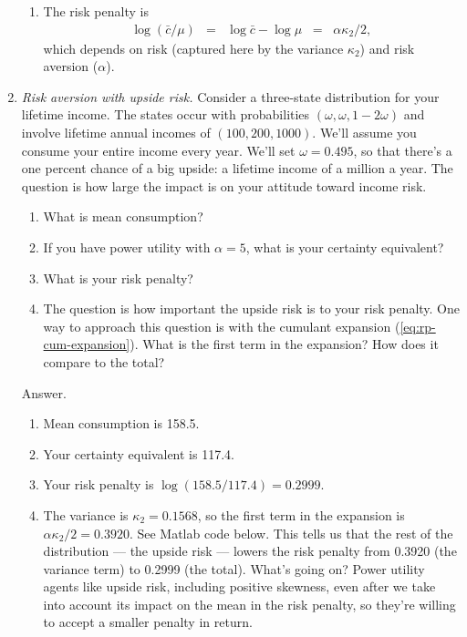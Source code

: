 \documentclass[11pt]{article}
\begin{document}
\begin{enumerate}
\begin{enumerate}
\item The risk penalty is
\begin{eqnarray*}
    \log (\bar{c}/\mu) &=& \log \bar{c} - \log \mu \;\;=\;\; \alpha\kappa_2/2 ,
\end{eqnarray*}
which depends on risk (captured here by the variance $\kappa_2$)
and risk aversion ($\alpha$).
\end{enumerate}


\item {\it Risk aversion with upside risk.\/}
Consider a three-state distribution for your lifetime income.
The states occur with probabilities $(\omega, \omega, 1-2\omega)$
and involve lifetime annual incomes of $(100, 200, 1000)$.
We'll assume you consume your entire income every year.
We'll set $\omega = 0.495$, so that there's a one percent chance
of a big upside:  a lifetime income of a million a year.
The question is how large the impact is on your attitude toward income risk.
%
\begin{enumerate}
\item What is mean consumption?
\item If you have power utility with $\alpha = 5$, what is your certainty equivalent?
\item What is your risk penalty?
\item The question is how important the upside risk is to your risk penalty.
One way to approach this question is with the cumulant expansion
(\ref{eq:rp-cum-expansion}).
What is the first term in the expansion?
How does it compare to the total?
\end{enumerate}
%
Answer.
\begin{enumerate}
\item Mean consumption is 158.5.
\item Your certainty equivalent is 117.4.
\item Your risk penalty is $ \log (158.5/117.4) = 0.2999$.
\item The variance is $\kappa_2 = 0.1568$, so the first term
in the expansion is $\alpha \kappa_2 / 2 = 0.3920$.
See Matlab code below.
This tells us that the rest of the distribution --- the upside risk ---
lowers the risk penalty from 0.3920 (the variance term) to 0.2999 (the total).
What's going on?
Power utility agents like upside risk, including positive skewness,
even after we take into account its impact on the mean in the risk penalty,
so they're willing to accept a smaller penalty in return.
\end{enumerate}


\end{enumerate}
\end{document}
